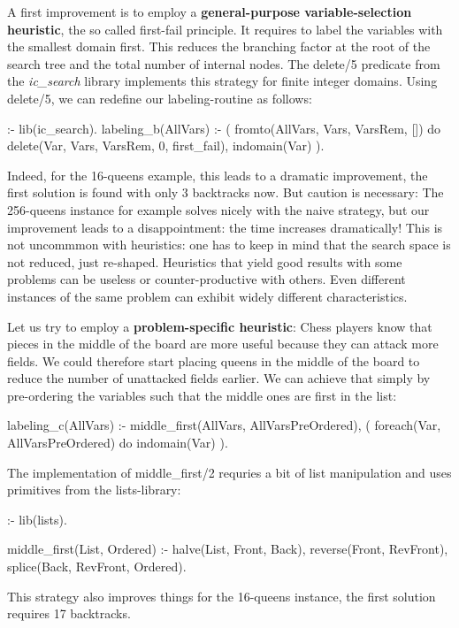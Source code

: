 A first improvement is to employ a
{\bf general-purpose variable-selection heuristic},
the so called first-fail principle. It requires to label the
variables with the smallest domain first. This reduces the branching
factor at the root of the search tree and the total number of internal nodes.
The delete/5 predicate from the {\em ic_search} library
implements this strategy for finite integer domains.
Using delete/5, we can redefine our labeling-routine as follows:
\begin{code}
:- lib(ic_search).
labeling_b(AllVars) :-
        ( fromto(AllVars, Vars, VarsRem, []) do
            delete(Var, Vars, VarsRem, 0, first_fail), %
            indomain(Var)                              %
        ).
\end{code}
Indeed, for the 16-queens example, this leads to a dramatic improvement,
the first solution is found with only 3 backtracks now.
But caution is necessary: The 256-queens instance for example solves
nicely with the naive strategy, but our improvement leads to a
disappointment: the time increases dramatically!
This is not uncommmon with heuristics: one has to keep in mind that the
search space is not reduced, just re-shaped. Heuristics that yield good
results with some problems can be useless or counter-productive with others.
Even different instances of the same problem can exhibit widely different
characteristics.
 
Let us try to employ a {\bf problem-specific heuristic}:
Chess players know that pieces in the middle of the board are more
useful because they can attack more fields. We could therefore start
placing queens in the middle of the board to reduce the number of
unattacked fields earlier. We can achieve that simply by pre-ordering the
variables such that the middle ones are first in the list:
\begin{code}
labeling_c(AllVars) :-
        middle_first(AllVars, AllVarsPreOrdered), %
        ( foreach(Var, AllVarsPreOrdered) do
            indomain(Var)                         %
        ).
\end{code}
The implementation of middle\_first/2 requries a bit of list manipulation
and uses primitives from the lists-library:
\begin{code}
:- lib(lists).

middle_first(List, Ordered) :-
        halve(List, Front, Back),
        reverse(Front, RevFront),
        splice(Back, RevFront, Ordered).
\end{code}
This strategy also improves things for the 16-queens instance, the
first solution requires 17 backtracks.

